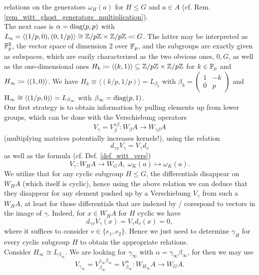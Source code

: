 relations on the generators $\omega_H (a)$ for $H \leq G$ and $a \in A$ (cf.
Rem. \ref{rem_witt_ghost_generators_multiplication}).\\
The next case is $\alpha = \mathrm{diag}(p,p)$ with $L_\alpha = \langle (1/p,0), (0,1/p)
\rangle \cong \mathbb{Z}/p\mathbb{Z} \times \mathbb{Z}/p\mathbb{Z} \eqqcolon G$. The latter may be interpreted
as $\mathbb{F}_p^2$, the vector space of dimension 2 over $\mathbb{F}_p$, and the subgroups
are exactly given as subspaces, which are easily characterized as the two
obvious ones, $0, G$, as well as the one-dimensional ones $H_k \coloneqq \langle
(k,1) \rangle \subseteq \mathbb{Z}/p\mathbb{Z} \times \mathbb{Z}/p\mathbb{Z}$ for $k \in \mathbb{F}_p$ and $H_\infty
\coloneqq \langle (1,0) \rangle$. We have $H_k \cong \langle (k/p,1/p) \rangle =
L_{\beta_k}$ with %
$\beta_k = \left( \begin{smallmatrix} 1 & -k \\ 0 & p \end{smallmatrix} \right)$
	and $\mathrm{H}_\infty \cong \langle (1/p,0) \rangle = L_{\beta_\infty}$ with
	$\beta_\infty = \mathrm{diag}(p,1)$.\\
Our first strategy is to obtain information by pulling elements up from lower
groups, which can be done with the Verschiebung operators 
\begin{displaymath}
  V_\gamma = V_{\beta}^{\gamma\beta}: W_\beta A \to W_{\gamma\beta} A
\end{displaymath}
(multiplying matrices
potentially increases kernels!), using the relation%
\[d_{\gamma v} V_\gamma = V_\gamma d_v\]%
as well as the formula (cf. Def. \ref{def_witt_vers})
\[ V_\gamma: W_H A \to W_G A, \; \omega_K (a) \mapsto \omega_K (a). \]
We utilize that for any cyclic subgroup $H \leq G$, the differentials disappear
on $W_H A$ (which itself is cyclic), hence using the above relation we can
deduce that they disappear for any element pushed up by a Verschiebung
$V_\gamma$ from such a $W_H A$, at least for those differentials that are
indexed by / corespond to vectors in the image of $\gamma$. Indeed, for $x \in
W_H A$ for $H$ cyclic we have
\begin{equation*}
	d_{\gamma v} V_\gamma (x) = V_\gamma d_v (x) = 0,
\end{equation*}
where it suffices to consider $v \in \{e_1,e_2\}$. Hence we just need to
determine $\gamma_H$ for every cyclic subgroup $H$ to obtain the appropriate
relations.\\
Consider $H_\infty \cong L_{\beta_\infty}$. We are looking for $\gamma_\infty$
with $\alpha = \gamma_\infty\beta_\infty$, for then we may use
\begin{equation*}
	V_{\gamma_\infty} = V_{\beta_\infty}^{\gamma_\infty\beta_\infty} = %
	V_{\beta_\infty}^{\alpha}: W_{H_\infty} A \to W_G A.
\end{equation*}
